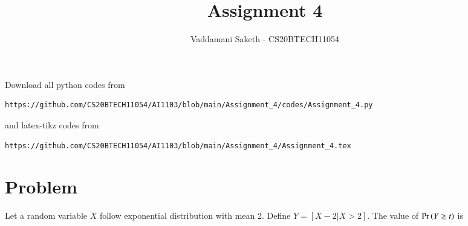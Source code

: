 \documentclass[journal,12pt,twocolumn]{IEEEtran}
\begin{document}
     \def\rightbox#1{\makebox[0in][r]{#1}}
     \def\centbox#1{\makebox[0in]{#1}}
     \def\topbox#1{\raisebox{-\baselineskip}[0in][0in]{#1}}
     \def\midbox#1{\raisebox{-0.5\baselineskip}[0in][0in]{#1}}
\vspace{3cm}
\title{Assignment 4}
\author{Vaddamani Saketh - CS20BTECH11054}
\maketitle
\newpage
\bigskip
\renewcommand{\thefigure}{\theenumi}
\renewcommand{\thetable}{\theenumi}
Download all python codes from 
\begin{lstlisting}
https://github.com/CS20BTECH11054/AI1103/blob/main/Assignment_4/codes/Assignment_4.py
\end{lstlisting}
%
and latex-tikz codes from 
%
\begin{lstlisting}
https://github.com/CS20BTECH11054/AI1103/blob/main/Assignment_4/Assignment_4.tex
\end{lstlisting}
\section{Problem}
Let a random variable $X$ follow exponential distribution with mean 2. Define $Y=[X-2|X>2]$. The value of $\Pr\left(Y \geq t\right)$ is
\end{document}

